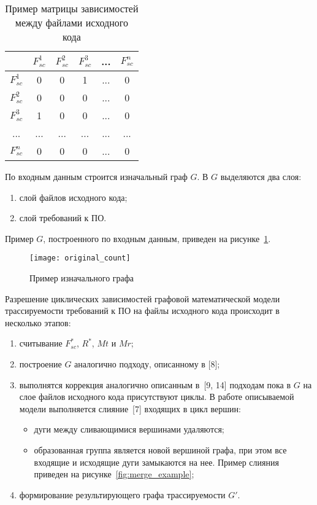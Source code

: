 \begin{longtable}{|c|c|c|c|c|c|}
\caption{Пример матрицы зависимостей между файлами исходного кода}
\label{tab:dependency_matrix}\\
\hline
& \cellcolor{platinum} $F_{sc}^1$ 
& \cellcolor{platinum} $F_{sc}^2$ 
& \cellcolor{platinum} $F_{sc}^3$ 
& ... 
& \cellcolor{platinum} $F_{sc}^n$ \\
\hline
\cellcolor{platinum} $F_{sc}^1$ & 0 & 0 & \cellcolor{light-blue} 1 & ... & 0 \\
\hline
\cellcolor{platinum} $F_{sc}^2$ & 0 & 0 & 0 & ... & 0 \\
\hline
\cellcolor{platinum} $F_{sc}^3$ & \cellcolor{mauve} 1 & 0 & 0 & ... & 0 \\
\hline
... & ... & ... & ... & ... & ... \\
\hline
\cellcolor{platinum} $F_{sc}^n $ & 0 & 0 & 0 & ... & 0 \\
\hline
\end{longtable}

По входным данным строится изначальный граф $G$. В $G$ выделяются два слоя:
\begin{enumerate}
    \item слой файлов исходного кода;
    \item слой требований к ПО.
\end{enumerate}

Пример $G$, построенного по входным данным, приведен на рисунке~\ref{fig:original_count}.

\begin{figure}[H]
    \centering
    \texttt{[image: original\_count]}
    \caption{Пример изначального графа}
    \label{fig:original_count}
\end{figure}

Разрешение циклических зависимостей графовой математической модели трассируемости требований к ПО на файлы исходного кода происходит в несколько этапов:
\begin{enumerate}
    \item считывание $F_{sc}^*$, $R^*$, $Mt$ и $Mr$;
    \item построение $G$ аналогично подходу, описанному в [8];
    \item выполнятся коррекция аналогично описанным в~[9, 14] подходам пока в $G$ на слое файлов исходного кода присутствуют циклы. В работе описываемой модели выполняется слияние~[7] входящих в цикл вершин:
    \begin{itemize}
        \item дуги между сливающимися вершинами удаляются;
        \item образованная группа является новой вершиной графа, при этом все входящие и исходящие дуги замыкаются на нее. Пример слияния приведен на рисунке~\ref{fig:merge_example};
    \end{itemize}
    \item формирование результирующего графа трассируемости $G'$.
\end{enumerate}

